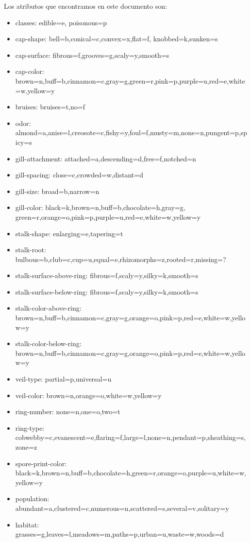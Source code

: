 \documentclass [a4paper] {article}
\begin{document}
\bigskip
Los atributos que encontramos en este documento son:
\begin{itemize}
\item classes: edible=e, poisonous=p
\item cap-shape: bell=b,conical=c,convex=x,flat=f, knobbed=k,sunken=s
\item cap-surface: fibrous=f,grooves=g,scaly=y,smooth=s
\item cap-color: brown=n,buff=b,cinnamon=c,gray=g,green=r,pink=p,purple=u,red=e,white=w,yellow=y
\item bruises: bruises=t,no=f
\item odor: almond=a,anise=l,creosote=c,fishy=y,foul=f,musty=m,none=n,pungent=p,spicy=s
\item gill-attachment: attached=a,descending=d,free=f,notched=n
\item gill-spacing: close=c,crowded=w,distant=d
\item gill-size: broad=b,narrow=n
\item gill-color: black=k,brown=n,buff=b,chocolate=h,gray=g, green=r,orange=o,pink=p,purple=u,red=e,white=w,yellow=y
\item stalk-shape: enlarging=e,tapering=t
\item stalk-root: bulbous=b,club=c,cup=u,equal=e,rhizomorphs=z,rooted=r,missing=?
\item stalk-surface-above-ring: fibrous=f,scaly=y,silky=k,smooth=s
\item stalk-surface-below-ring: fibrous=f,scaly=y,silky=k,smooth=s
\item stalk-color-above-ring: brown=n,buff=b,cinnamon=c,gray=g,orange=o,pink=p,red=e,white=w,yellow=y
\item stalk-color-below-ring: brown=n,buff=b,cinnamon=c,gray=g,orange=o,pink=p,red=e,white=w,yellow=y
\item veil-type: partial=p,universal=u
\item veil-color: brown=n,orange=o,white=w,yellow=y
\item ring-number: none=n,one=o,two=t
\item ring-type: cobwebby=c,evanescent=e,flaring=f,large=l,none=n,pendant=p,sheathing=s,zone=z
\item spore-print-color: black=k,brown=n,buff=b,chocolate=h,green=r,orange=o,purple=u,white=w,yellow=y
\item population: abundant=a,clustered=c,numerous=n,scattered=s,several=v,solitary=y
\item habitat: grasses=g,leaves=l,meadows=m,paths=p,urban=u,waste=w,woods=d
\end{itemize}
\end{document}
